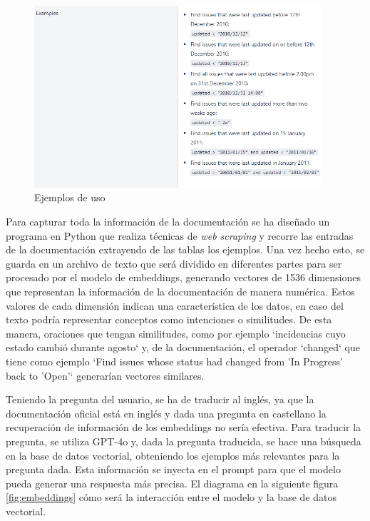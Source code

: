 \begin{figure}[H]
    \centering
    \includegraphics[width=0.95\textwidth]{images/JQL_docs_updated2.png}
    \caption{Ejemplos de uso}\label{fig:examples}
\end{figure}

Para capturar toda la información de la documentación se ha diseñado un programa en Python que realiza técnicas de \textit{web scraping} y recorre las entradas de la documentación extrayendo de las tablas los ejemplos. Una vez hecho esto, se guarda en un archivo de texto que será dividido en diferentes partes para ser procesado por el modelo de embeddings, generando vectores de 1536 dimensiones que representan la información de la documentación de manera numérica. Estos valores de cada dimensión indican una característica de los datos, en caso del texto podría representar conceptos como intenciones o similitudes. De esta manera, oraciones que tengan similitudes, como por ejemplo `incidencias cuyo estado cambió durante agosto` y, de la documentación, el operador `changed` que tiene como ejemplo `Find issues whose status had changed from 'In Progress' back to 'Open'` generarían vectores similares.

Teniendo la pregunta del usuario, se ha de traducir al inglés, ya que la documentación oficial está en inglés y dada una pregunta en castellano la recuperación de información de los embeddings no sería efectiva. Para traducir la pregunta, se utiliza GPT-4o y, dada la pregunta traducida, se hace una búsqueda en la base de datos vectorial, obteniendo los ejemplos más relevantes para la pregunta dada. Esta información se inyecta en el prompt para que el modelo pueda generar una respuesta más precisa. El diagrama en la siguiente figura \ref{fig:embeddings} cómo será la interacción entre el modelo y la base de datos vectorial.

